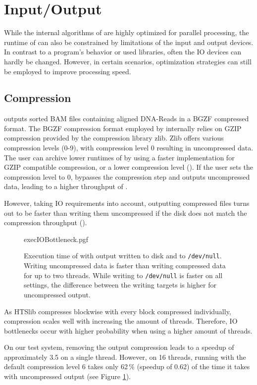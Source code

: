 \section{Input/Output} 
While the internal algorithms of \sort are highly optimized for parallel processing, the runtime of \sort can also be constrained by limitations of the input and output devices. 
In contrast to a program's behavior or used libraries, often the IO devices can hardly be changed. However, in certain scenarios, optimization strategies can still be employed to improve processing speed.

\subsection{Compression}
\sort outputs sorted BAM files containing aligned DNA-Reads in a BGZF compressed format. The BGZF compression format employed by \sort internally relies on GZIP compression provided by the compression library zlib. Zlib offers various compression levels (0-9), with compression level 0 resulting in uncompressed data.
The user can archive lower runtimes of \sort by using a faster implementation for GZIP compatible compression, or a lower compression level (). If the user sets the compression level to 0, \sort bypasses the compression step and outputs uncompressed data, leading to a higher throughput of \sort. 

However, taking IO requirements into account, outputting compressed files turns out to be faster than writing them uncompressed if the disk does not match the compression throughput (). 
\begin{figure}[h]
        {execIOBottleneck.pgf}
    \caption{Execution time of \sort with output written to disk and to \texttt{/dev/null}. \threads \points \\ 
    Writing uncompressed data is faster than writing compressed data for up to two threads. While writing to \texttt{/dev/null} is faster on all settings, the difference between the writing targets is higher for uncompressed output.}
    \label{fig:execIO}
\end{figure}
As HTSlib compresses blockwise with every block compressed individually, compression scales well with increasing the amount of threads. Therefore, IO bottlenecks occur with higher probability when using a higher amount of threads. 

On our test system, removing the output compression leads to a speedup of approximately 3.5 on a single thread. However, on 16 threads, running \sort with the default compression level 6 takes only 62\,\% (speedup of 0.62) of the time it takes with uncompressed output (see Figure \ref{fig:execIO}).

